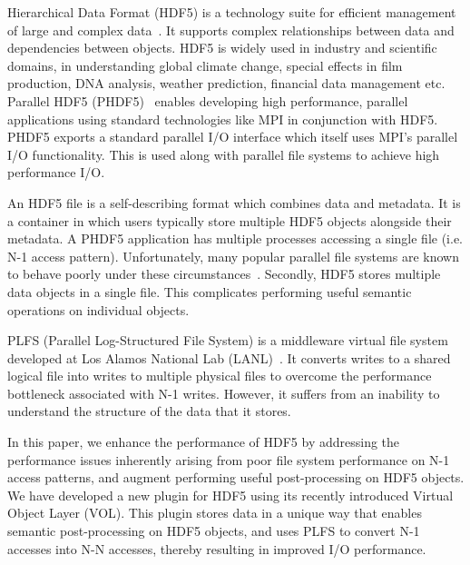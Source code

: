 Hierarchical Data Format (HDF5) is a technology suite for efficient management of large and complex data~\cite{hdf5_ad11}. It supports complex relationships between data and dependencies between objects. HDF5 is widely used in industry and scientific domains, in understanding global climate change, special effects in film production, DNA analysis, weather prediction, financial data management etc.~\cite{hdf5_users}
Parallel HDF5 (PHDF5)~\cite{phdf5} enables developing high performance, parallel applications using standard technologies like MPI in conjunction with HDF5. 
PHDF5 exports a standard parallel I/O interface which itself uses MPI's parallel I/O functionality. This is used along with parallel file systems to achieve high performance I/O.

An HDF5 file is a self-describing format which combines data and metadata. It is a container in which users typically store multiple HDF5 objects alongside their metadata. 
A PHDF5 application has multiple processes accessing a single file (i.e. N-1 access pattern). Unfortunately, many popular parallel file systems are known to behave poorly under these circumstances~\cite{lustre_perf,nersc_io}. Secondly, HDF5 stores multiple data objects in a single file. This complicates performing useful semantic operations on individual objects.  

PLFS (Parallel Log-Structured File System) is a middleware virtual file system developed at Los Alamos National Lab (LANL)~\cite{plfs_sc09}. It converts writes to a shared logical file into writes to multiple physical files to overcome the performance bottleneck associated with N-1 writes. However, it suffers from an inability to understand the structure of the data that it stores.

In this paper, we enhance the performance of HDF5 by addressing the performance issues inherently arising from poor file system performance on N-1 access patterns, and augment performing  useful post-processing on HDF5 objects.
We have developed a new plugin for HDF5 using its recently introduced Virtual Object Layer (VOL).  
This plugin stores data in a unique way that enables semantic post-processing on HDF5 objects, and uses PLFS to convert N-1 accesses into N-N accesses, thereby resulting in improved I/O performance.



